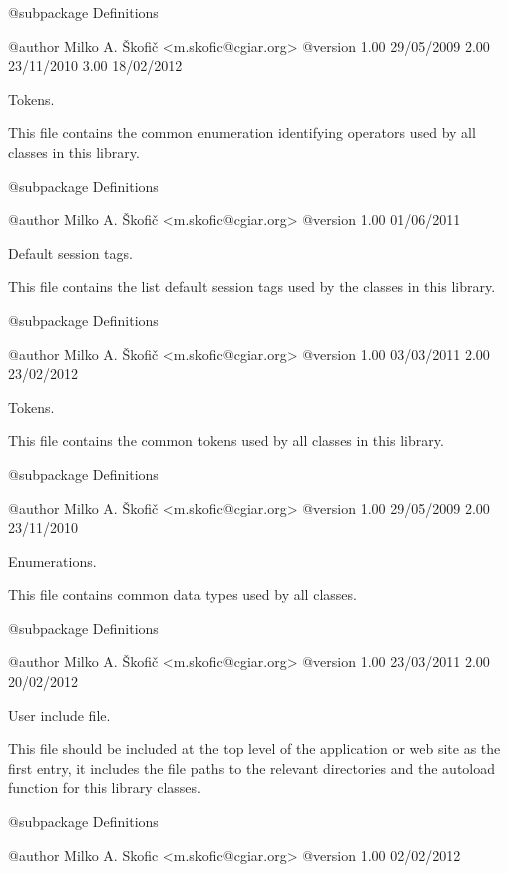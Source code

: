 \begin{DoxyVerb}    @subpackage     Definitions

    @author         Milko A. Škofič <m.skofic@cgiar.org>
    @version        1.00 29/05/2009
                            2.00 23/11/2010
                            3.00 18/02/2012\end{DoxyVerb}


Tokens.

This file contains the common enumeration identifying operators used by all classes in this library.

\begin{DoxyVerb}    @subpackage     Definitions

    @author         Milko A. Škofič <m.skofic@cgiar.org>
    @version        1.00 01/06/2011\end{DoxyVerb}


Default session tags.

This file contains the list default session tags used by the classes in this library.

\begin{DoxyVerb}    @subpackage     Definitions

    @author         Milko A. Škofič <m.skofic@cgiar.org>
    @version        1.00 03/03/2011
                            2.00 23/02/2012\end{DoxyVerb}


Tokens.

This file contains the common tokens used by all classes in this library.

\begin{DoxyVerb}    @subpackage     Definitions

    @author         Milko A. Škofič <m.skofic@cgiar.org>
    @version        1.00 29/05/2009
                            2.00 23/11/2010\end{DoxyVerb}


Enumerations.

This file contains common data types used by all classes.

\begin{DoxyVerb}    @subpackage     Definitions

    @author         Milko A. Škofič <m.skofic@cgiar.org>
    @version        1.00 23/03/2011
                            2.00 20/02/2012\end{DoxyVerb}


User include file.

This file should be included at the top level of the application or web site as the first entry, it includes the file paths to the relevant directories and the autoload function for this library classes.

\begin{DoxyVerb}    @subpackage     Definitions

    @author         Milko A. Skofic <m.skofic@cgiar.org>
    @version        1.00 02/02/2012\end{DoxyVerb}
 